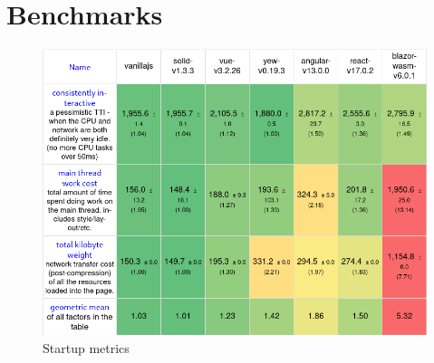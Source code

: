 \chapter{Benchmarks}
\label{appendix:bench}
\begin{figure}[h]
  \begin{center}
    \includegraphics[width=\textwidth]{figures/benchmarks/startup_metrics.png}
  \end{center}
  \caption{Startup metrics}
  \label{fig:bench_startup}
\end{figure}

